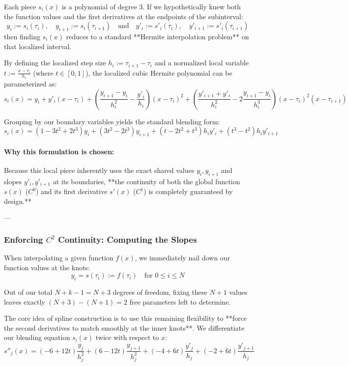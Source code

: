 \documentclass{article}
\begin{document}
Each piece $s_i(x)$ is a polynomial of degree 3. If we hypothetically knew both the function values and the first derivatives at the endpoints of the subinterval:
\[y_i := s_i(\tau_i), \quad y_{i+1} := s_i(\tau_{i+1}) \quad \text{and} \quad y'_i := s'_i(\tau_i), \quad y'_{i+1} := s'_i(\tau_{i+1})\]
then finding $s_i(x)$ reduces to a standard **Hermite interpolation problem** on that localized interval. 

By defining the localized step size $h_i := \tau_{i+1} - \tau_i$ and a normalized local variable $t := \frac{x - \tau_i}{h_i}$ (where $t \in [0, 1]$), the localized cubic Hermite polynomial can be parameterized as:
\[s_i(x) = y_i + y'_i(x - \tau_i) + \left( \frac{y_{i+1} - y_i}{h_i^2} - \frac{y'_i}{h_i} \right)(x - \tau_i)^2 + \left( \frac{y'_{i+1} + y'_i}{h_i^2} - 2\frac{y_{i+1} - y_i}{h_i^3} \right)(x - \tau_i)^2(x - \tau_{i+1})\]

Grouping by our boundary variables yields the standard blending form:
\[s_i(x) = (1 - 3t^2 + 2t^3)y_i + (3t^2 - 2t^3)y_{i+1} + (t - 2t^2 + t^3)h_iy'_i + (t^3 - t^2)h_iy'_{i+1}\]

\paragraph{Why this formulation is chosen:} Because this local piece inherently uses the exact shared values $y_i, y_{i+1}$ and slopes $y'_i, y'_{i+1}$ at its boundaries, **the continuity of both the global function $s(x)$ ($C^0$) and its first derivative $s'(x)$ ($C^1$) is completely guaranteed by design.**

---

\subsubsection{Enforcing $C^2$ Continuity: Computing the Slopes}
When interpolating a given function $f(x)$, we immediately nail down our function values at the knots:
\[y_i = s(\tau_i) := f(\tau_i) \quad \text{for } 0 \leq i \leq N\]

Out of our total $N + k - 1 = N + 3$ degrees of freedom, fixing these $N+1$ values leaves exactly $(N+3) - (N+1) = 2$ free parameters left to determine. 

The core idea of spline construction is to use this remaining flexibility to **force the second derivatives to match smoothly at the inner knots**. We differentiate our blending equation $s_i(x)$ twice with respect to $x$:
\[s''_j(x) = (-6 + 12t)\frac{y_j}{h_j^2} + (6 - 12t)\frac{y_{j+1}}{h_j^2} + (-4 + 6t)\frac{y'_j}{h_j} + (-2 + 6t)\frac{y'_{j+1}}{h_j}\]
\end{document}
